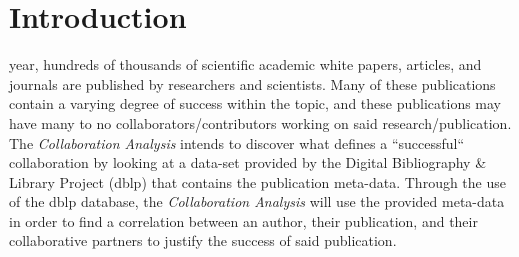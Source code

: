 \documentclass[10pt,journal,compsoc]{IEEEtran}
\begin{document}
\ifCLASSOPTIONcompsoc
{}
\else
\section{Introduction}
\label{sec:introduction}
\fi




% 
% 
% 
% 
 year, hundreds of thousands of scientific academic white papers, articles, and journals are published by researchers and scientists. Many of these publications contain a varying degree of success within the topic, and these publications may have many to no collaborators/contributors working on said research/publication. The \textit{Collaboration Analysis} intends to discover what defines a ``successful`` collaboration by looking at a data-set provided by the Digital Bibliography \& Library Project (dblp) that contains the publication meta-data. Through the use of the dblp database, the \textit{Collaboration Analysis} will use the provided meta-data in order to find a correlation between an author, their publication, and their collaborative partners to justify the success of said publication.
\end{document}
